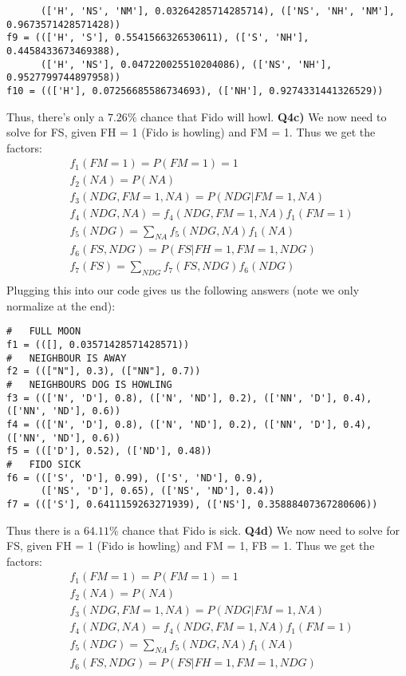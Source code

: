 \documentclass{article}
\begin{document}
\begin{titlepage}
\begin{lstlisting}
      (['H', 'NS', 'NM'], 0.03264285714285714), (['NS', 'NH', 'NM'], 0.9673571428571428))
f9 = ((['H', 'S'], 0.5541566326530611), (['S', 'NH'], 0.4458433673469388),
      (['H', 'NS'], 0.047220025510204086), (['NS', 'NH'], 0.9527799744897958))
f10 = ((['H'], 0.07256685586734693), (['NH'], 0.9274331441326529))
\end{lstlisting}
Thus, there's only a $7.26\%$ chance that Fido will howl.
\newpage
\textbf{Q4c)} We now need to solve for FS, given FH = 1 (Fido is howling) and FM = 1. Thus we get the factors:
\begin{align*}
& f_1(FM = 1) = P(FM = 1) = 1 \\ 
& f_2(NA) = P(NA) \\
& f_3(NDG, FM = 1, NA) = P(NDG | FM = 1, NA) \\
& f_4(NDG, NA) = f_4(NDG, FM = 1, NA)f_1(FM = 1)  \\
& f_5(NDG) = \sum_{NA} f_5(NDG, NA)f_1(NA) \\
& f_6(FS, NDG) = P(FS | FH = 1, FM = 1, NDG) \\
& f_7(FS) = \sum_{NDG} f_7(FS, NDG)f_6(NDG)  \\
\end{align*}
Plugging this into our code gives us the following answers (note we only normalize at the end):
\begin{lstlisting}
#   FULL MOON
f1 = (([], 0.03571428571428571))
#   NEIGHBOUR IS AWAY
f2 = ((["N"], 0.3), (["NN"], 0.7))
#   NEIGHBOURS DOG IS HOWLING
f3 = ((['N', 'D'], 0.8), (['N', 'ND'], 0.2), (['NN', 'D'], 0.4), (['NN', 'ND'], 0.6))
f4 = ((['N', 'D'], 0.8), (['N', 'ND'], 0.2), (['NN', 'D'], 0.4), (['NN', 'ND'], 0.6))
f5 = ((['D'], 0.52), (['ND'], 0.48))
#   FIDO SICK
f6 = ((['S', 'D'], 0.99), (['S', 'ND'], 0.9), 
	  (['NS', 'D'], 0.65), (['NS', 'ND'], 0.4))
f7 = ((['S'], 0.6411159263271939), (['NS'], 0.35888407367280606))
\end{lstlisting}
Thus there is a $64.11\%$ chance that Fido is sick.
\newpage
\textbf{Q4d)} We now need to solve for FS, given FH = 1 (Fido is howling) and FM = 1, FB = 1. Thus we get the factors:
\begin{align*}
& f_1(FM = 1) = P(FM = 1) = 1 \\ 
& f_2(NA) = P(NA) \\
& f_3(NDG, FM = 1, NA) = P(NDG | FM = 1, NA) \\
& f_4(NDG, NA) = f_4(NDG, FM = 1, NA)f_1(FM = 1)  \\
& f_5(NDG) = \sum_{NA} f_5(NDG, NA)f_1(NA) \\
& f_6(FS, NDG) = P(FS | FH = 1, FM = 1, NDG) \\

\end{align*}
\end{titlepage}
\end{document}
